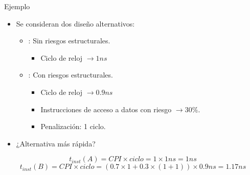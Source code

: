 \begin{frame}[t]{Ejemplo}
\begin{itemize}
  \item Se consideran dos diseño alternativos:
    \begin{itemize}
      \item {}: Sin riesgos estructurales.
        \begin{itemize}
          \item Ciclo de reloj $\rightarrow 1 ns$
        \end{itemize}
      \item {}: Con riesgos estructurales.
        \begin{itemize}
          \item Ciclo de reloj $\rightarrow 0.9 ns$
          \item Instrucciones de acceso a datos con riesgo $\rightarrow 30\%$.
          \item Penalización: 1 ciclo.
        \end{itemize}
    \end{itemize}
  
  \item ¿Alternativa más rápida?
\end{itemize}
\[
t_{inst}(A) =
CPI \times ciclo = 1 \times 1 ns = 1 ns
\]
\[
t_{inst}(B) =
CPI \times ciclo = (0.7 \times 1 + 0.3 \times (1 + 1)) \times 0.9 ns =
1.17 ns
\]
\end{frame}
